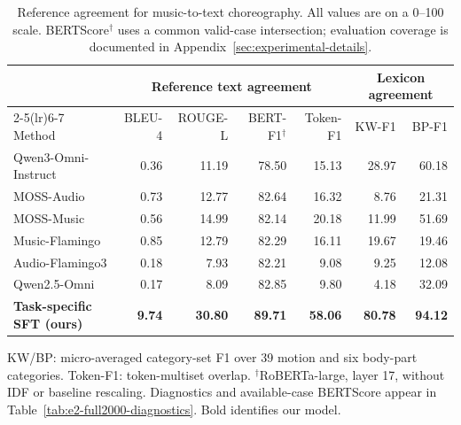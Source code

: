 \begin{table}[t]
\centering
\caption{Reference agreement for music-to-text choreography. All values are on a 0--100 scale. BERTScore$^{\dagger}$ uses a common valid-case intersection; evaluation coverage is documented in Appendix~\ref{sec:experimental-details}.}
\label{tab:e2-full2000-v2}
\begingroup
\small
\setlength{\tabcolsep}{3pt}
\renewcommand{\arraystretch}{1.15}
\begin{tabular*}{\textwidth}{@{\extracolsep{\fill}}lrrrrrr@{}}
\toprule
& \multicolumn{4}{c}{Reference text agreement} & \multicolumn{2}{c}{Lexicon agreement}\\
\cmidrule(lr){2-5}\cmidrule(lr){6-7}
Method & BLEU-4 & ROUGE-L & BERT-F1$^{\dagger}$ & Token-F1 & KW-F1 & BP-F1 \\
\midrule
Qwen3-Omni-Instruct & 0.36 & 11.19 & 78.50 & 15.13 & 28.97 & 60.18 \\
MOSS-Audio & 0.73 & 12.77 & 82.64 & 16.32 & 8.76 & 21.31 \\
MOSS-Music & 0.56 & 14.99 & 82.14 & 20.18 & 11.99 & 51.69 \\
Music-Flamingo & 0.85 & 12.79 & 82.29 & 16.11 & 19.67 & 19.46 \\
Audio-Flamingo3 & 0.18 & 7.93 & 82.21 & 9.08 & 9.25 & 12.08 \\
Qwen2.5-Omni & 0.17 & 8.09 & 82.85 & 9.80 & 4.18 & 32.09 \\
\midrule
\textbf{Task-specific SFT (ours)} & \textbf{9.74} & \textbf{30.80} & \textbf{89.71} & \textbf{58.06} & \textbf{80.78} & \textbf{94.12} \\
\bottomrule
\end{tabular*}
\par\vspace{4pt}
\begin{minipage}{\textwidth}\footnotesize
KW/BP: micro-averaged category-set F1 over 39 motion and six body-part
categories. Token-F1: token-multiset overlap. $^{\dagger}$RoBERTa-large,
layer 17, without IDF or baseline rescaling. Diagnostics and available-case BERTScore appear in
Table~\ref{tab:e2-full2000-diagnostics}. Bold identifies our model.
\end{minipage}
\endgroup
\end{table}

